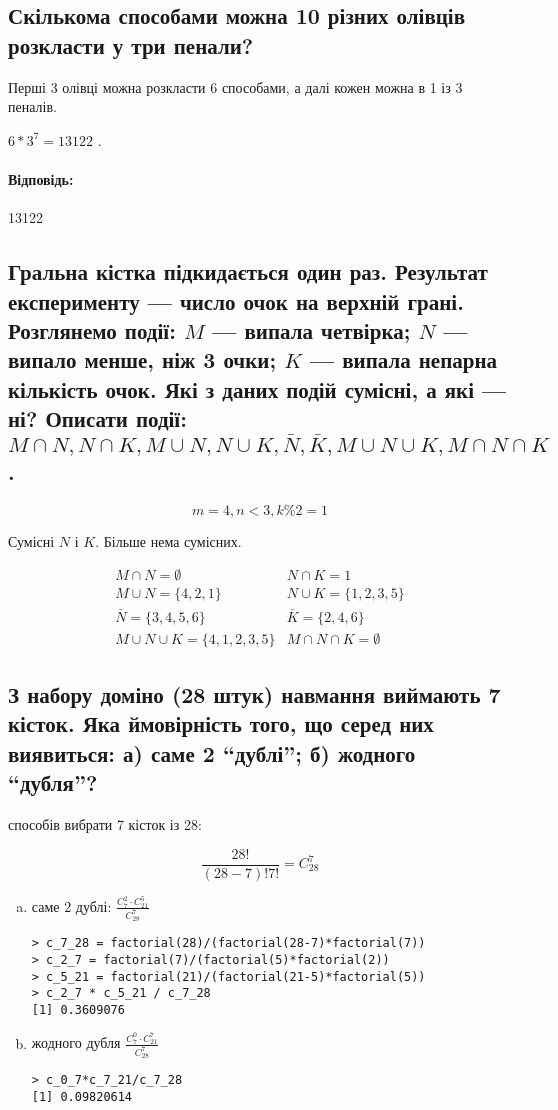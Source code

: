 \documentclass[a4paper, 12pt, oneside]{extarticle}
\newcommand{\Problem}{\subsection}
\newcommand{\Answer}[1]{
\medskip
\null\hfill
\begin{boxedminipage}{\textwidth}
	\paragraph{Відповідь: }{#1}
\end{boxedminipage}
}
\begin{document}


\Problem{Скількома способами можна 10 різних олівців
розкласти у три пенали?}

Перші 3 олівці можна розкласти 6 способами, а далі кожен
можна в 1 із 3 пеналів.

$
6*3^7
= 13122
$
.

\Answer{13122}

\Problem{Гральна кістка підкидається один раз. Результат експерименту --- число очок на верхній грані. Розглянемо події: $M$ --- випала четвірка; $N$ --- випало менше, ніж 3 очки; $K$ --- випала непарна кількість очок. Які з даних подій сумісні, а які --- ні? Описати події: $M \cap N, N \cap K, M \cup N, N \cup K, \bar N, \bar K, M \cup N \cup K, M \cap N \cap K$.}

$$
m=4, n<3, k\%2=1
$$

Сумісні $N$ і $K$. Більше нема сумісних.

$$
\begin{array}{ll}
	M \cap N = \emptyset &
	N \cap K = 1 \\
	M \cup N = \{4, 2, 1\} &
	N \cup K = \{1,2,3,5\} \\
	\bar N = \{3,4,5,6\} &
	\bar K = \{2,4,6\} \\
	M \cup N \cup K = \{4,1,2,3,5\} &
	M \cap N \cap K = \emptyset
\end{array}
$$

\Problem{З набору доміно (28 штук) навмання виймають 7 кісток. Яка ймовірність того, що серед них виявиться: а) саме 2 ``дублі''; б) жодного ``дубля''?}

способів вибрати 7 кісток із 28:

$$
	\frac{28!}{(28-7)!7!} = C_{28}^7
$$

\begin{enumerate}[a)]
	\item саме 2 дублі:
		$
			\frac{C_7^2 \cdot C_{21}^5}{C_{28}^7}
		$

\begin{verbatim}
> c_7_28 = factorial(28)/(factorial(28-7)*factorial(7))
> c_2_7 = factorial(7)/(factorial(5)*factorial(2))
> c_5_21 = factorial(21)/(factorial(21-5)*factorial(5))
> c_2_7 * c_5_21 / c_7_28
[1] 0.3609076
\end{verbatim}

	\item жодного дубля
		$
			\frac{C_7^0 \cdot C_{21}^7}{C_{28}^7}
		$
\begin{verbatim}
> c_0_7*c_7_21/c_7_28
[1] 0.09820614
\end{verbatim}

\end{enumerate}
\end{document}

